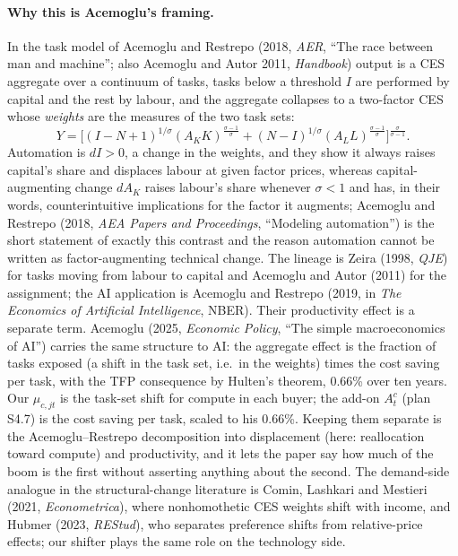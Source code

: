\documentclass[11pt]{article}
\begin{document}
\paragraph{Why this is Acemoglu's framing.} In the task model of Acemoglu and Restrepo (2018, \emph{AER}, ``The race between man and machine''; also Acemoglu and Autor 2011, \emph{Handbook}) output is a CES aggregate over a continuum of tasks, tasks below a threshold $I$ are performed by capital and the rest by labour, and the aggregate collapses to a two-factor CES whose \emph{weights} are the measures of the two task sets:
\[
Y = \Big[(I-N+1)^{1/\sigma}(A_K K)^{\frac{\sigma-1}{\sigma}} + (N-I)^{1/\sigma}(A_L L)^{\frac{\sigma-1}{\sigma}}\Big]^{\frac{\sigma}{\sigma-1}} .
\]
Automation is $dI>0$, a change in the weights, and they show it always raises capital's share and displaces labour at given factor prices, whereas capital-augmenting change $dA_K$ raises labour's share whenever $\sigma<1$ and has, in their words, counterintuitive implications for the factor it augments; Acemoglu and Restrepo (2018, \emph{AEA Papers and Proceedings}, ``Modeling automation'') is the short statement of exactly this contrast and the reason automation cannot be written as factor-augmenting technical change. The lineage is Zeira (1998, \emph{QJE}) for tasks moving from labour to capital and Acemoglu and Autor (2011) for the assignment; the AI application is Acemoglu and Restrepo (2019, in \emph{The Economics of Artificial Intelligence}, NBER). Their productivity effect is a separate term. Acemoglu (2025, \emph{Economic Policy}, ``The simple macroeconomics of AI'') carries the same structure to AI: the aggregate effect is the fraction of tasks exposed (a shift in the task set, i.e.\ in the weights) times the cost saving per task, with the TFP consequence by Hulten's theorem, 0.66\% over ten years. Our $\mu_{c,jt}$ is the task-set shift for compute in each buyer; the add-on $A^c_t$ (plan S4.7) is the cost saving per task, scaled to his 0.66\%. Keeping them separate is the Acemoglu--Restrepo decomposition into displacement (here: reallocation toward compute) and productivity, and it lets the paper say how much of the boom is the first without asserting anything about the second. The demand-side analogue in the structural-change literature is Comin, Lashkari and Mestieri (2021, \emph{Econometrica}), where nonhomothetic CES weights shift with income, and Hubmer (2023, \emph{REStud}), who separates preference shifts from relative-price effects; our shifter plays the same role on the technology side.
\end{document}
